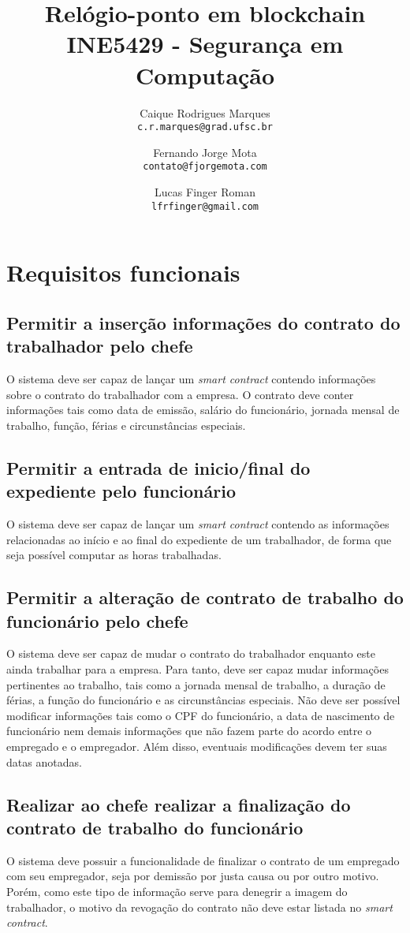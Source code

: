 \documentclass{article}
\title{\textbf{Relógio-ponto em blockchain \\
        \large INE5429 - Segurança em Computação}}
\author{
    Caique Rodrigues Marques \\
    {\texttt{c.r.marques@grad.ufsc.br}}
    \and
    Fernando Jorge Mota \\
    {\texttt{contato@fjorgemota.com}}
    \and
    Lucas Finger Roman \\
    {\texttt{lfrfinger@gmail.com}}
}
\date{}
\begin{document}
\maketitle
\tableofcontents{}
\section{Requisitos funcionais}

\subsection{Permitir a inserção informações do contrato do trabalhador pelo
chefe}
O sistema deve ser capaz de lançar um \textit{smart contract} contendo
informações sobre o contrato do trabalhador com a empresa. O contrato deve
conter informações tais como data de emissão, salário do funcionário, jornada
mensal de trabalho, função, férias e circunstâncias especiais.

\subsection{Permitir a entrada de inicio/final do expediente pelo funcionário}
O sistema deve ser capaz de lançar um \textit{smart contract} contendo as
informações relacionadas ao início e ao final do expediente de um trabalhador,
de forma que seja possível computar as horas trabalhadas.

\subsection{Permitir a alteração de contrato de trabalho do funcionário pelo
chefe}
O sistema deve ser capaz de mudar o contrato do trabalhador enquanto este ainda
trabalhar para a empresa. Para tanto, deve ser capaz mudar informações
pertinentes ao trabalho, tais como a jornada mensal de trabalho, a duração de
férias, a função do funcionário e as circunstâncias especiais. Não deve ser
possível modificar informações tais como o CPF do funcionário, a data de
nascimento de funcionário nem demais informações que não fazem parte do acordo
entre o empregado e o empregador. Além disso, eventuais modificações devem ter
suas datas anotadas.

\subsection{Realizar ao chefe realizar a finalização do contrato de trabalho do
funcionário}
O sistema deve possuir a funcionalidade de finalizar o contrato de um empregado
com seu empregador, seja por demissão por justa causa ou por outro motivo.
Porém, como este tipo de informação serve para denegrir a imagem do
trabalhador, o motivo da revogação do contrato não deve estar listada no
\textit{smart contract}.
\end{document}
